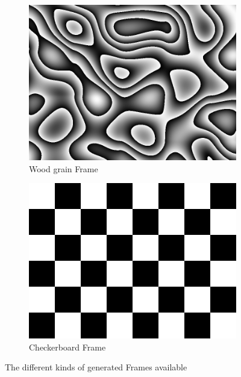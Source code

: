 \documentclass[11pt,a4paper]{article}
\begin{document}
\begin{figure}
	\begin{subfigure}[t]{0.35\textwidth}
	\includegraphics[width=1\textwidth]{wood.png}
	\caption{Wood grain Frame}
	\end{subfigure}
	\hspace{1em}
	\begin{subfigure}[t]{0.35\textwidth}
	\includegraphics[width=1\textwidth]{checkerboard.png}
	\caption{Checkerboard Frame}
	\end{subfigure}
	
	\caption{The different kinds of generated Frames available}
	\label{fig:frame_types}
\end{figure}
\end{document}
